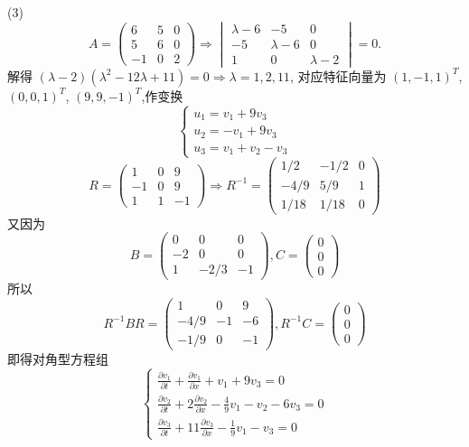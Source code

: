 \begin{solve}
  (3)\[A=
  \begin{pmatrix}
  6&5&0\\5&6&0\\-1&0&2
  \end{pmatrix}\Rightarrow
  \begin{vmatrix}
  \lambda-6&-5&0\\-5&\lambda-6&0\\1&0&\lambda-2
  \end{vmatrix}=0.\]
  解得 $(\lambda-2)(\lambda^2-12\lambda+11)=0\Rightarrow\lambda=1,2,11$,
  对应特征向量为 $(1,-1,1)^T$, $(0,0,1)^T$, $(9,9,-1)^T$,作变换
  \[\begin{cases}
  u_1=v_1+9v_3\\
  u_2=-v_1+9v_3\\
  u_3=v_1+v_2-v_3
  \end{cases}\]
  \[R=\begin{pmatrix}
  1&0&9\\-1&0&9\\1&1&-1
  \end{pmatrix}
  \Rightarrow
  R^{-1}=
  \begin{pmatrix}
  1/2&-1/2&0\\-4/9&5/9&1\\1/18&1/18&0
  \end{pmatrix}\]
  又因为
  \[B=\begin{pmatrix}
  0&0&0\\-2&0&0\\1&-2/3&-1
  \end{pmatrix},C=\begin{pmatrix}
  0\\0\\0
  \end{pmatrix}\]
  所以
  \[R^{-1}BR=\begin{pmatrix}
  1&0&9\\-4/9&-1&-6\\-1/9&0&-1
  \end{pmatrix},R^{-1}C=\begin{pmatrix}
  0\\0\\0
  \end{pmatrix}\]
  即得对角型方程组
  \[\begin{cases}
  \frac{\partial v_1}{\partial t}+\frac{\partial v_1}{\partial x}+v_1+9v_3=0\\
  \frac{\partial v_2}{\partial t}+2\frac{\partial v_2}{\partial x}-\frac{4}{9}v_1-v_2-6v_3=0\\
  \frac{\partial v_3}{\partial t}+11\frac{\partial v_3}{\partial x}-\frac{1}{9}v_1-v_3=0
  \end{cases}\]
\end{solve}


